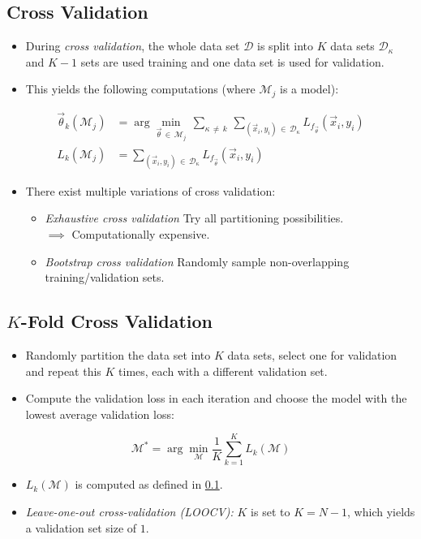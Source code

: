 		\subsection{Cross Validation}
			\label{sec:crossvalidation}

			\begin{itemize}
				\item During \emph{cross validation}, the whole data set \(\mathcal{D}\) is split into \(K\) data sets \( \mathcal{D}_\kappa \) and \(K - 1\) sets are used training and one data set is used for validation.
				\item This yields the following computations (where \(\mathcal{M}_j\) is a model):
			\end{itemize}
			\begin{align}
				\vec{\theta}_k (\mathcal{M}_j) & = \arg\min_{\vec{\theta} \,\in\, \mathcal{M}_j} \, \sum_{\kappa \,\neq\, k} \, \sum_{(\vec{x}_i, y_i) \,\in\, \mathcal{D}_\kappa} L_{f_{\vec{\theta}}} (\vec{x}_i, y_i) \\
				L_k(\mathcal{M}_j)             & =  \sum_{(\vec{x}_i, y_i) \,\in\, \mathcal{D}_\kappa} L_{f_{\vec{\theta}}} (\vec{x}_i, y_i)
			\end{align}
			\begin{itemize}
				\item There exist multiple variations of cross validation:
					\begin{itemize}
						\item \emph{Exhaustive cross validation} \tabto{5cm} Try all partitioning possibilities. \\
							\tabto{5cm} \qquad \( \implies \) Computationally expensive.
						\item \emph{Bootstrap cross validation} \tabto{5cm} Randomly sample non-overlapping training/validation sets.
					\end{itemize}
			\end{itemize}

		\subsection{\(K\)-Fold Cross Validation}
			\begin{itemize}
				\item Randomly partition the data set into \(K\) data sets, select one for validation and repeat this \(K\) times, each with a different validation set.
				\item Compute the validation loss in each iteration and choose the model with the lowest average validation loss:
			\end{itemize}
			\begin{equation}
				\mathcal{M}^\ast = \arg\min_\mathcal{M} \frac{1}{K} \sum_{k = 1}^{K} L_k(\mathcal{M})
			\end{equation}
			\begin{itemize}
				\item \(L_k(\mathcal{M})\) is computed as defined in \ref{sec:crossvalidation}.
				\item \emph{Leave-one-out cross-validation (LOOCV):} \(K\) is set to \( K = N - 1 \), which yields a validation set size of \(1\).
			\end{itemize}

